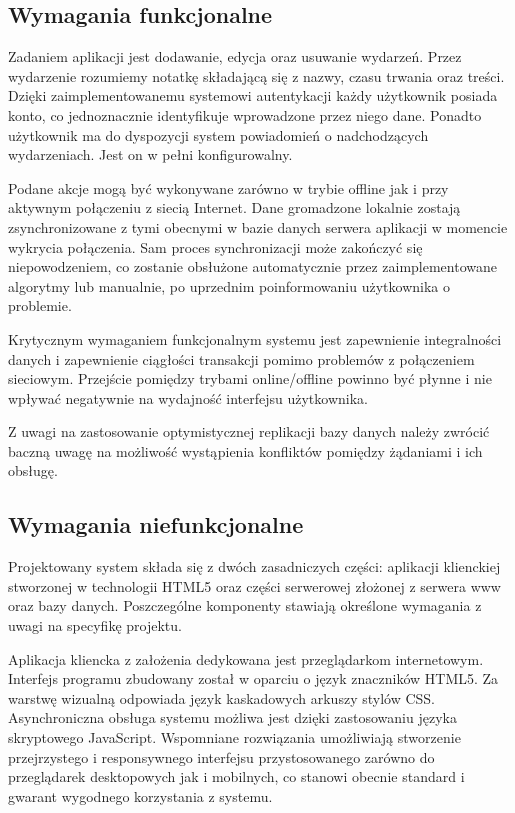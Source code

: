 \subsection{Wymagania funkcjonalne}
\label{sec:wymFunkcj}

Zadaniem aplikacji jest dodawanie, edycja oraz usuwanie wydarzeń. Przez wydarzenie rozumiemy notatkę składającą się z nazwy, czasu trwania oraz treści. Dzięki zaimplementowanemu systemowi autentykacji każdy użytkownik posiada konto, co jednoznacznie identyfikuje wprowadzone przez niego dane. Ponadto użytkownik ma do dyspozycji system powiadomień o nadchodzących wydarzeniach. Jest on w pełni konfigurowalny.

Podane akcje mogą być wykonywane zarówno w trybie offline jak i przy aktywnym połączeniu z siecią Internet. Dane gromadzone lokalnie zostają zsynchronizowane z tymi obecnymi w bazie danych serwera aplikacji w momencie wykrycia połączenia. Sam proces synchronizacji może zakończyć się niepowodzeniem, co zostanie obsłużone automatycznie przez zaimplementowane algorytmy lub manualnie, po uprzednim poinformowaniu użytkownika o problemie.

Krytycznym wymaganiem funkcjonalnym systemu jest zapewnienie integralności danych i zapewnienie ciągłości transakcji pomimo problemów z połączeniem sieciowym. Przejście pomiędzy trybami online/offline powinno być płynne i nie wpływać negatywnie na wydajność interfejsu użytkownika.

Z uwagi na zastosowanie optymistycznej replikacji bazy danych należy zwrócić baczną uwagę na możliwość wystąpienia konfliktów pomiędzy żądaniami i ich obsługę.

\subsection{Wymagania niefunkcjonalne}
\label{sec:wymNieFunkcj}

Projektowany system składa się z dwóch zasadniczych części: aplikacji klienckiej stworzonej w technologii HTML5 oraz części serwerowej złożonej z serwera www oraz bazy danych. Poszczególne komponenty stawiają określone wymagania z uwagi na specyfikę projektu.

Aplikacja kliencka z założenia dedykowana jest przeglądarkom internetowym. Interfejs programu zbudowany został w oparciu o język znaczników HTML5. Za warstwę wizualną odpowiada język kaskadowych arkuszy stylów CSS. Asynchroniczna obsługa systemu możliwa jest dzięki zastosowaniu języka skryptowego JavaScript. Wspomniane rozwiązania umożliwiają stworzenie przejrzystego i responsywnego interfejsu przystosowanego zarówno do przeglądarek desktopowych jak i mobilnych, co stanowi obecnie standard i gwarant wygodnego korzystania z systemu.

